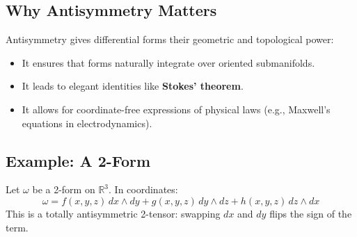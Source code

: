 \documentclass{article}
\begin{document}
	\subsection*{Why Antisymmetry Matters}
	
	Antisymmetry gives differential forms their geometric and topological power:
	\begin{itemize}
		\item It ensures that forms naturally integrate over oriented submanifolds.
		\item It leads to elegant identities like \textbf{Stokes' theorem}.
		\item It allows for coordinate-free expressions of physical laws (e.g., Maxwell’s equations in electrodynamics).
	\end{itemize}
	
	\subsection*{Example: A 2-Form}
	
	Let \( \omega \) be a 2-form on \( \mathbb{R}^3 \). In coordinates:
	\[
	\omega = f(x, y, z)\, dx \wedge dy + g(x, y, z)\, dy \wedge dz + h(x, y, z)\, dz \wedge dx
	\]
	This is a totally antisymmetric 2-tensor: swapping \( dx \) and \( dy \) flips the sign of the term.
	
\end{document}
